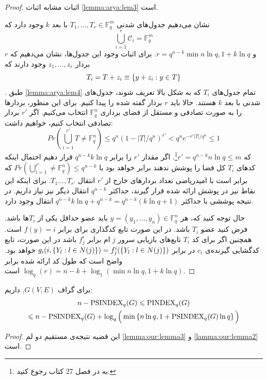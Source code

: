 \begin{proof}
	اثبات مشابه اثبات
	\autoref{lemma:arya:lem3}
	است.
	
	نشان می‌دهیم جدول‌های شدنی
	$T_1, \ldots, T_r \in \mathbb{F}_q^m$
	با بعد
	$k$
	وجود دارد که
	\begin{equation}
		\bigcup_{i = 1}^r \mathcal{C}_i = \mathbb{F}_q^m
	\end{equation}
	و 
	$r = q^{n - k} \min{n \ln q, 1 + k \ln q}$.
	برای اثبات وجود این جدول‌ها، نشان می‌دهیم که
	$r$
	بردار
	$z_1, \dots, z_r$
	وجود دارند که
	\begin{equation}
		T_i = T + z_i \equiv \left\{ y + z_i: y \in T \right\}
	\end{equation}.
	طبق
	\autoref{lemma:arya:lem4}
	تمام جدول‌های
	$T_i$
	که به شکل بالا تعریف شوند، جدول‌های شدنی	با بعد
	$k$
	هستند.	 حالا باید $r$ بردار گفته شده را پیدا کنیم. برای این منظور، بردارها را به صورت تصادفی و مستقل از فضای برداری
	$\mathbb{F}_q^n$
	انتخاب می‌کنیم. اگر
	$r'$
	بردار تصادفی انتخاب کنیم، خواهیم داشت:
	\begin{equation}
	Pr(\bigcup_{i = 1}^{r'} T \ne \mathbb{F}_q^n) \leq q^n (1 - |T|/q^n)^{r'} < q^n e^{- r' |T| / q^n} \leq 1
	\end{equation}
	که
	$r' = q^{n - k} n \ln q \leq m$\footnote{
		به
		در فصل 27 کتاب
		\cite{graham1995handbook}
		رجوع کنید.
	}.
	اگر مقدار
	$r'$
	را برابر
	$q^{n - k} k \ln q$
	قرار دهیم احتمال اینکه کدهای
	$T_i$
	کل فضا را پوشش ندهند برابر خواهد بود با
	$Pr(\bigcup_{i = 1}^{r'} \ne \mathbb{F}_q^n) \leq q^{n - k}$
	که برابر است با امیدریاضی تعداد بردارهای خارج از 
	$r'$
	انتقال
	$T_1\ldots, T_{r'}$.
	برای اینکه این نقاط نیز در پوشش ارائه شده قرار گیرند، حداکثر 
	$q^{n - k}$
	انتقال دیگر نیز نیاز داریم. در نتیجه پوششی با حداکثر
	$q^{n - k} k \ln q + q^{n - k} = q^{n - k}(k \ln q + 1)$
	انتقال وجود دارد.
	 	 
	حال توجه کنید که، هر
	$y = (y_1, \dots, y_n) \in \mathbb{F}_q^n$
	باید عضو حداقل یکی از
	$T_i$ها
	باشد. فرض کنید عضو
	$T_i$
	باشد. در این صورت تابع کدگذاری برای
	\icod
	برابر
	$f(y) = i$
	است. همچنین اگر برای کد
	$T_i$
	تابع‌های بازیابی سرور
	$j$
	ام برابر
	$f_j^i$
	باشد در این صورت، تابع کدگشایی گیرنده‌ی
	$c_i$
	در
	\icod
	برابر
	$g_i(i, \left\{ Y_l: l \in N(j) \right\}) = f_j^i(\left\{ Y_l: l \in N(j) \right\})$
	خواهد بود.
	واضح است که طول کد 
	\icod
	ارائه شده برابر
	$\log_q(r) = n - k + \log_1(\min{n \ln q, 1 + k \ln q})$
	است.
\end{proof}
\begin{theorem}
	\label{thm:ourmain}
	برای گراف
	$G(V,E)$,
	داریم:
	\begin{multline}
		n - \mathrm{PSINDEX}_q(G) \leqslant \mathrm{PINDEX}_q(G) \\ \leqslant n -\mathrm{PSINDEX}_q(G) + \log_q\Big(\min\left\{ n\ln q, 1+ \mathrm{PSINDEX}_q(G)\ln q  \right\}\Big)
	\end{multline}
\end{theorem}
\begin{proof}
	این قضیه نتیجه‌ی مستقیم دو لم
	\autoref{lemma:our:lemma3}
	و
	\autoref{lamma:our:lemma2}
	است.
\end{proof}

